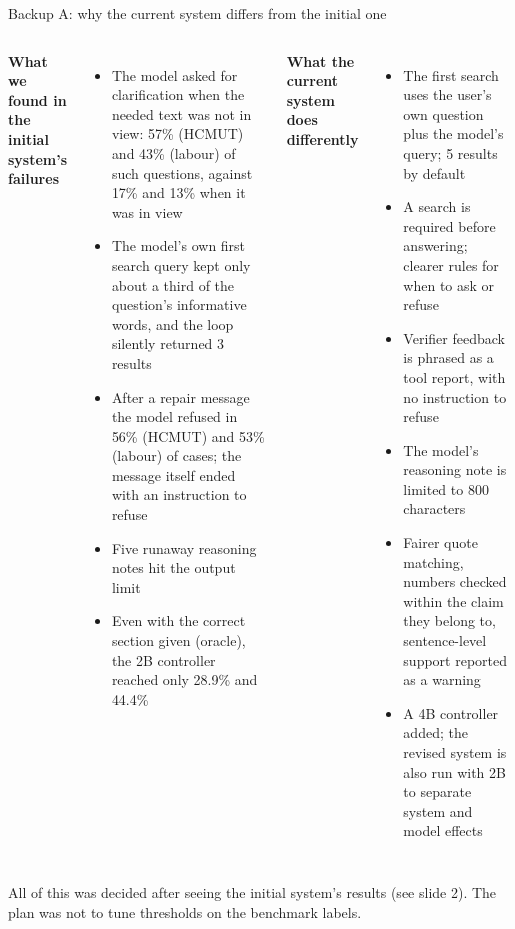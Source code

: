 \documentclass[aspectratio=1610,11pt]{beamer}
\begin{document}
\appendix
\begin{frame}{Backup A: why the current system differs from the initial one}
  \footnotesize
  \begin{columns}[T]
    \textbf{What we found in the initial system's failures}
    \begin{itemize}
      \item The model asked for clarification when the needed text was not in view: 57\% (HCMUT) and 43\% (labour) of such questions, against 17\% and 13\% when it was in view
      \item The model's own first search query kept only about a third of the question's informative words, and the loop silently returned 3 results
      \item After a repair message the model refused in 56\% (HCMUT) and 53\% (labour) of cases; the message itself ended with an instruction to refuse
      \item Five runaway reasoning notes hit the output limit
      \item Even with the correct section given (oracle), the 2B controller reached only 28.9\% and 44.4\%
    \end{itemize}
    \textbf{What the current system does differently}
    \begin{itemize}
      \item The first search uses the user's own question plus the model's query; 5 results by default
      \item A search is required before answering; clearer rules for when to ask or refuse
      \item Verifier feedback is phrased as a tool report, with no instruction to refuse
      \item The model's reasoning note is limited to 800 characters
      \item Fairer quote matching, numbers checked within the claim they belong to, sentence-level support reported as a warning
      \item A 4B controller added; the revised system is also run with 2B to separate system and model effects
    \end{itemize}
  \end{columns}
  \vspace{4pt}
  {\scriptsize All of this was decided after seeing the initial system's results (see slide 2). The plan was not to tune thresholds on the benchmark labels.}
\end{frame}
\end{document}
